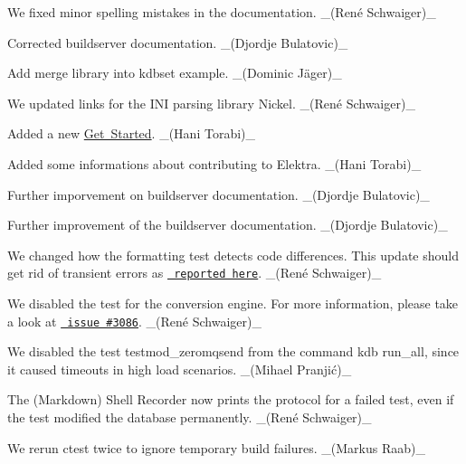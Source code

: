 \begin{DoxyItemize}
\item We fixed minor spelling mistakes in the documentation. \+\_\+(René Schwaiger)\+\_\+
\item Corrected buildserver documentation. \+\_\+(\+Djordje Bulatovic)\+\_\+
\item Add merge library into kdbset example. \+\_\+(Dominic Jäger)\+\_\+
\item We updated links for the I\+NI parsing library Nickel. \+\_\+(René Schwaiger)\+\_\+
\item Added a new \mbox{\hyperlink{doc_GETSTARTED_md}{Get Started}}. \+\_\+(\+Hani Torabi)\+\_\+
\item Added some informations about contributing to Elektra. \+\_\+(\+Hani Torabi)\+\_\+
\item Further imporvement on buildserver documentation. \+\_\+(\+Djordje Bulatovic)\+\_\+
\item Further improvement of the buildserver documentation. \+\_\+(\+Djordje Bulatovic)\+\_\+
\end{DoxyItemize}


\begin{DoxyItemize}
\item We changed how the formatting test detects code differences. This update should get rid of transient errors as \href{https://issues.libelektra.org/2927\#issuecomment-528058641}{\texttt{ reported here}}. \+\_\+(René Schwaiger)\+\_\+
\item We disabled the test for the conversion engine. For more information, please take a look at \href{https://issues.libelektra.org/3086}{\texttt{ issue \#3086}}. \+\_\+(René Schwaiger)\+\_\+
\item We disabled the test {\ttfamily testmod\+\_\+zeromqsend} from the command {\ttfamily kdb run\+\_\+all}, since it caused timeouts in high load scenarios. \+\_\+(Mihael Pranjić)\+\_\+
\item The (Markdown) Shell Recorder now prints the protocol for a failed test, even if the test modified the database permanently. \+\_\+(René Schwaiger)\+\_\+
\item We rerun ctest twice to ignore temporary build failures. \+\_\+(\+Markus Raab)\+\_\+
\end{DoxyItemize}


